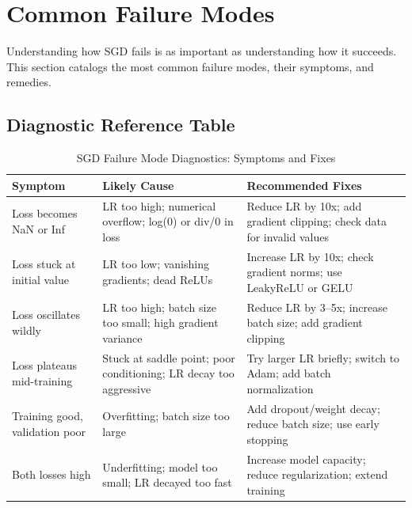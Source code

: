 \documentclass[../../main.tex]{subfiles}
\begin{document}
\section{Common Failure Modes}
\label{sec:ch10-common-failures}

Understanding how SGD fails is as important as understanding how it succeeds. This section catalogs the most common failure modes, their symptoms, and remedies.

\subsection{Diagnostic Reference Table}

\begin{table}[htbp]
\centering
\small
\caption{SGD Failure Mode Diagnostics: Symptoms and Fixes}
\label{tab:ch10-failure-modes}
\begin{tabularx}{\textwidth}{@{}>{\raggedright\arraybackslash}p{2.8cm} >{\raggedright\arraybackslash}X >{\raggedright\arraybackslash}X@{}}
\toprule
\textbf{Symptom} & \textbf{Likely Cause} & \textbf{Recommended Fixes} \\
\midrule
Loss becomes NaN or Inf & LR too high; numerical overflow; log(0) or div/0 in loss & Reduce LR by 10x; add gradient clipping; check data for invalid values \\
\addlinespace
Loss stuck at initial value & LR too low; vanishing gradients; dead ReLUs & Increase LR by 10x; check gradient norms; use LeakyReLU or GELU \\
\addlinespace
Loss oscillates wildly & LR too high; batch size too small; high gradient variance & Reduce LR by 3--5x; increase batch size; add gradient clipping \\
\addlinespace
Loss plateaus mid-training & Stuck at saddle point; poor conditioning; LR decay too aggressive & Try larger LR briefly; switch to Adam; add batch normalization \\
\addlinespace
Training good, validation poor & Overfitting; batch size too large & Add dropout/weight decay; reduce batch size; use early stopping \\
\addlinespace
Both losses high & Underfitting; model too small; LR decayed too fast & Increase model capacity; reduce regularization; extend training \\
\bottomrule
\end{tabularx}
\end{table}
\end{document}
